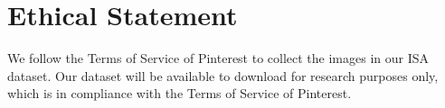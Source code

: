 \section*{Ethical Statement}

We follow the Terms of Service of Pinterest to collect the images in our ISA dataset.
Our dataset will be available to download for research purposes only, which is in compliance with the Terms of Service of Pinterest. 
